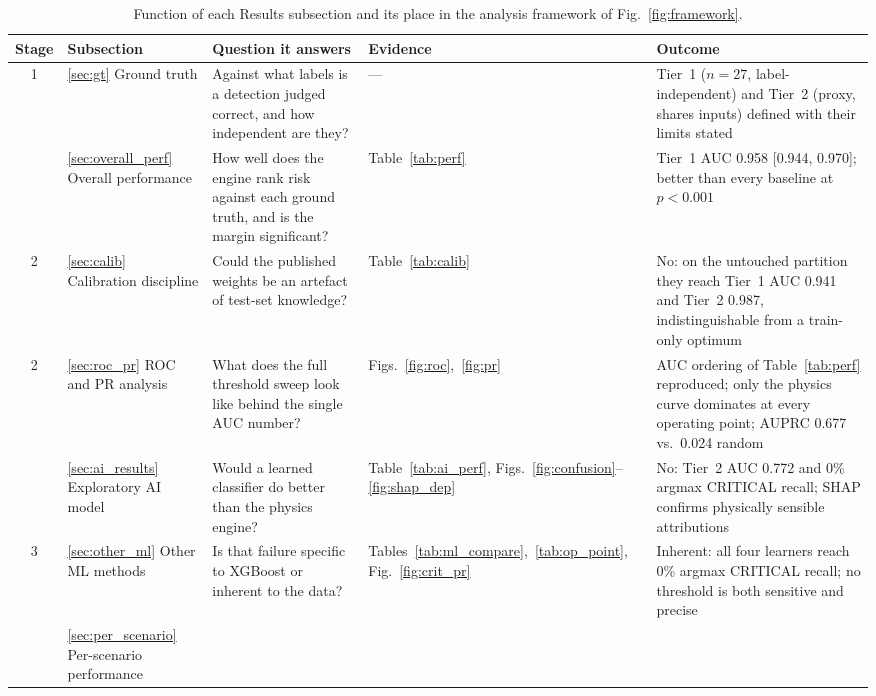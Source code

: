 \documentclass[sn-mathphys-num,Numbered,iicol]{sn-jnl}
\begin{document}
\begin{table}[htbp]
  \centering
  \caption{Function of each Results subsection and its place in the analysis framework of Fig.~\ref{fig:framework}.}
  \label{tab:framework}
  \renewcommand{\arraystretch}{1.25}
  \begin{tabular}{@{}cp{2.4cm}p{4.0cm}p{2.5cm}p{4.4cm}@{}}
    \toprule
    \textbf{Stage} & \textbf{Subsection} & \textbf{Question it answers} & \textbf{Evidence} & \textbf{Outcome} \\
    \midrule
    1 & \ref{sec:gt} Ground truth
      & Against what labels is a detection judged correct, and how independent are they?
      & ---
      & Tier~1 ($n=27$, label-independent) and Tier~2 (proxy, shares inputs) defined with their limits stated \\
    \addlinespace
    2 & \ref{sec:overall_perf} Overall performance
      & How well does the engine rank risk against each ground truth, and is the margin significant?
      & Table~\ref{tab:perf}
      & Tier~1 AUC 0.958 [0.944, 0.970]; better than every baseline at $p<0.001$ \\
    2 & \ref{sec:calib} Calibration discipline
      & Could the published weights be an artefact of test-set knowledge?
      & Table~\ref{tab:calib}
      & No: on the untouched partition they reach Tier~1 AUC 0.941 and Tier~2 0.987, indistinguishable from a train-only optimum \\
    2 & \ref{sec:roc_pr} ROC and PR analysis
      & What does the full threshold sweep look like behind the single AUC number?
      & Figs.~\ref{fig:roc},~\ref{fig:pr}
      & AUC ordering of Table~\ref{tab:perf} reproduced; only the physics curve dominates at every operating point; AUPRC 0.677 vs.\ 0.024 random \\
    \addlinespace
    3 & \ref{sec:ai_results} Exploratory AI model
      & Would a learned classifier do better than the physics engine?
      & Table~\ref{tab:ai_perf}, Figs.~\ref{fig:confusion}--\ref{fig:shap_dep}
      & No: Tier~2 AUC 0.772 and 0\% argmax CRITICAL recall; SHAP confirms physically sensible attributions \\
    3 & \ref{sec:other_ml} Other ML methods
      & Is that failure specific to XGBoost or inherent to the data?
      & Tables~\ref{tab:ml_compare},~\ref{tab:op_point}, Fig.~\ref{fig:crit_pr}
      & Inherent: all four learners reach 0\% argmax CRITICAL recall; no threshold is both sensitive and precise \\
    \addlinespace
    4 & \ref{sec:per_scenario} Per-scenario performance

\end{tabular}
\end{table}
\end{document}
